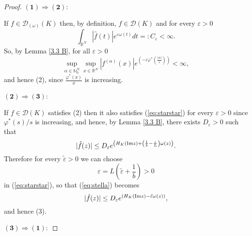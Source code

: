 \documentclass[twoside]{amsart}
\begin{document}
\begin{proof}
  $\mathbf{(1)\Rightarrow(2)}:$
  
If $f\in{\mathcal{D}}_{(\omega)}(K)$ then, by definition, $f\in{\mathcal{D}}(K)$ and for every
$\varepsilon>0$ 
\[
\int_{\mathbb{R}^{N}}|\hat{f}(t)|e^{\varepsilon\omega(t)}dt=:C_{\varepsilon}<\infty.
\]
So, by Lemma \ref{3.3 B}, for all $\varepsilon>0$
\begin{equation}
\underset{\alpha\in\mathbb{N}_{0}^{N}}{\sup}
\underset{x\in\mathbb{R}^{N}}{\sup}|f^{(\alpha)}(x)|
e^{\left(-\varepsilon\varphi^{*}\left(\frac{|\alpha|}{\varepsilon}\right)\right)}
<\infty,
\label{eq:starstar}
\end{equation}
and hence (2), since ${\displaystyle \frac{\varphi^{*}(x)}{x}}$ is increasing.

\textbf{$\mathbf{(2)\Rightarrow(3)}$}:

If $f\in{\mathcal{D}}(K)$ satisfies (2) then it
also satisfies (\ref{eq:starstar}) for every $\varepsilon>0$ since 
$\varphi^*(s)/s$ is increasing, and hence,
by Lemma \ref{3.3 B}, there exists $D_{\varepsilon}>0$ such that 
\begin{equation}
|\hat{f}(z)|\leq{\displaystyle D_{\varepsilon}
e^{\left(H_{K}({\mathop{\rm Im}\nolimits} z)+\left(\frac{1}{b}-\frac{\varepsilon}{L}\right)\omega(z)\right)}.}
\label{eq:stella}
\end{equation}
Therefore for every $\tilde{\varepsilon}>0$ we can choose 
\[
\varepsilon=L\left(\tilde{\varepsilon}+\frac{1}{b}\right)>0
\]
in (\ref{eq:starstar}), so that (\ref{eq:stella}) becomes 
\[
|\hat{f}(z)|\leq{\displaystyle D_{\varepsilon}
e^{(H_{K}({\mathop{\rm Im}\nolimits} z)-\tilde{\varepsilon}\omega(z))},}
\]
and hence (3).

$\mathbf{(3)\Rightarrow(1)}:$


\end{proof}
\end{document}
